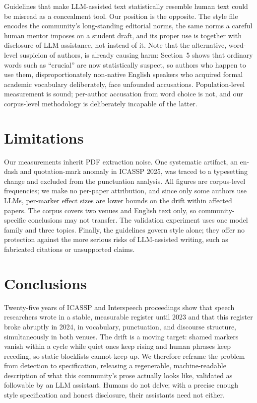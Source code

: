\documentclass[a4paper,10pt,twocolumn]{article}
\begin{document}
Guidelines that make LLM-assisted text statistically resemble human text could be misread as a concealment tool. Our position is the opposite. The style file encodes the community's long-standing editorial norms, the same norms a careful human mentor imposes on a student draft, and its proper use is together with disclosure of LLM assistance, not instead of it. Note that the alternative, word-level suspicion of authors, is already causing harm: Section~5 shows that ordinary words such as ``crucial'' are now statistically suspect, so authors who happen to use them, disproportionately non-native English speakers who acquired formal academic vocabulary deliberately, face unfounded accusations. Population-level measurement is sound; per-author accusation from word choice is not, and our corpus-level methodology is deliberately incapable of the latter.

\section{Limitations}

Our measurements inherit PDF extraction noise. One systematic artifact, an en-dash and quotation-mark anomaly in ICASSP 2025, was traced to a typesetting change and excluded from the punctuation analysis. All figures are corpus-level frequencies; we make no per-paper attribution, and since only some authors use LLMs, per-marker effect sizes are lower bounds on the drift within affected papers. The corpus covers two venues and English text only, so community-specific conclusions may not transfer. The validation experiment uses one model family and three topics. Finally, the guidelines govern style alone; they offer no protection against the more serious risks of LLM-assisted writing, such as fabricated citations or unsupported claims.

\section{Conclusions}

Twenty-five years of ICASSP and Interspeech proceedings show that speech researchers wrote in a stable, measurable register until 2023 and that this register broke abruptly in 2024, in vocabulary, punctuation, and discourse structure, simultaneously in both venues. The drift is a moving target: shamed markers vanish within a cycle while quiet ones keep rising and human phrases keep receding, so static blocklists cannot keep up. We therefore reframe the problem from detection to specification, releasing a regenerable, machine-readable description of what this community's prose actually looks like, validated as followable by an LLM assistant. Humans do not delve; with a precise enough style specification and honest disclosure, their assistants need not either.
\end{document}
